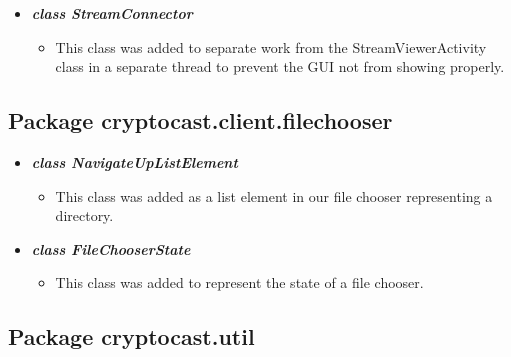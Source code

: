 \documentclass[a4paper,10pt]{scrartcl}
\begin{document}
\begin{itemize}
    \item \textbf{\textit{class StreamConnector}} 
	\begin{itemize}
	 \item This class was added to separate work from the StreamViewerActivity class 
	in a separate thread to prevent the GUI not from showing properly.
	\end{itemize}
	
\end{itemize}

	
\subsection{Package cryptocast.client.filechooser}

\begin{itemize}

 \item \textit{\textbf{class NavigateUpListElement}}
	\begin{itemize}
	 \item This class was added as a list element in our file chooser representing a directory.
	\end{itemize}
	 
    \item \textbf{\textit{class FileChooserState}}
	\begin{itemize}
	 \item This class was added to represent the state of a file chooser.
	\end{itemize}
	
\end{itemize}
	
\subsection{Package cryptocast.util}
\end{document}
